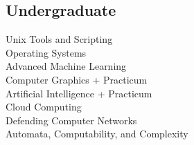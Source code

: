\documentclass[]{deedy-resume-openfont}
\begin{document}
\begin{minipage}[t]{0.33\textwidth}
\subsection{Undergraduate}
\textbullet{} Unix Tools and Scripting \\
\textbullet{} Operating Systems \\
\textbullet{} Advanced Machine Learning \\
\textbullet{} Computer Graphics + Practicum \\
\textbullet{} Artificial Intelligence + Practicum \\
\textbullet{} Cloud Computing \\
\textbullet{} Defending Computer Networks \\
\textbullet{} Automata, Computability, and Complexity \\
\sectionsep

\end{minipage} 
\hfill
\end{document}

